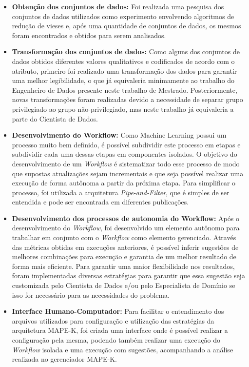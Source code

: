 \documentclass[portugues]{ic-tese}
\begin{document}
\begin{itemize}
\item \textbf{Obtenção dos conjuntos de dados:} Foi realizada uma pesquisa dos conjuntos de dados utilizados como experimento envolvendo algoritmos de redução de vieses e, após uma quantidade de conjuntos de dados, os mesmos foram encontrados e obtidos para serem analisados.

\item \textbf{Transformação dos conjuntos de dados:} Como alguns dos conjuntos de dados obtidos diferentes valores qualitativos e codificados de acordo com o atributo, primeiro foi realizado uma transformação dos dados para garantir uma melhor legibilidade, o que já equivaleria minimamente ao trabalho do Engenheiro de Dados presente neste trabalho de Mestrado. Posteriormente, novas transformações foram realizadas devido a necessidade de separar grupo privilegiado ao grupo não-privilegiado, mas neste trabalho já equivaleria a parte do Cientista de Dados.

\item \textbf{Desenvolvimento do Workflow:} Como Machine Learning possui um processo muito bem definido, é possível subdividir este processo em etapas e subdividir cada uma dessas etapas em componentes isolados. O objetivo do desenvolvimento de um \textit{Workflow} é sistematizar todo esse processo de modo que supostas atualizações sejam incrementais e que seja possível realizar uma execução de forma autônoma a partir da próxima etapa. Para simplificar o processo, foi utilizada a arquitetura \textit{Pipe-and-Filter}, que é simples de ser entendida e pode ser encontrada em diferentes publicações.

\item \textbf{Desenvolvimento dos processos de autonomia do Workflow:} Após o desenvolvimento do \textit{Workflow}, foi desenvolvido um elemento autônomo para trabalhar em conjunto com o \textit{Workflow} como elemento gerenciado. Através das métricas obtidas em execuções anteriores, é possível inferir sugestões de melhores combinações para execução e garantia de um melhor resultado de forma mais eficiente. Para garantir uma maior flexibilidade nos resultados, foram implementadas diversas estratégias para garantir que essa sugestão seja customizada pelo Cientista de Dados e/ou pelo Especialista de Domínio se isso for necessário para as necessidades do problema.

\item \textbf{Interface Humano-Computador:} Para facilitar o entendimento dos arquivos utilizados para configuração e utilização das estratégias da arquitetura MAPE-K, foi criada uma interface onde é possível realizar a configuração pela mesma, podendo também realizar uma execução do \textit{Workflow} isolada e uma execução com sugestões, acompanhando a análise realizada no gerenciador MAPE-K.

\end{itemize}
\end{document}
